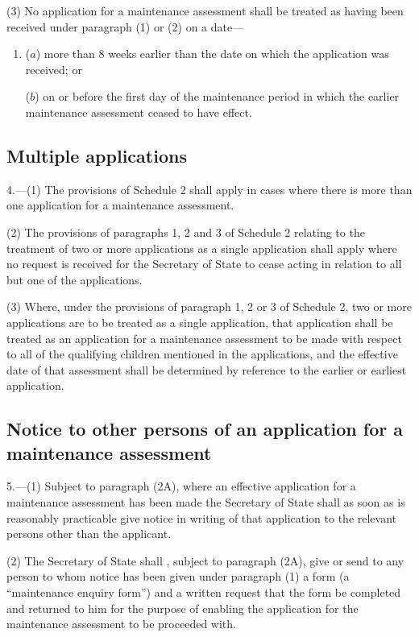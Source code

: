 \documentclass[a4paper]{article}
\begin{document}
(3) No application for a maintenance assessment shall be treated as having been received under paragraph (1) or (2) on a date—
\begin{enumerate}\item[]
($a$) more than 8 weeks earlier than the date on which the application was received; or

($b$) on or before the first day of the maintenance period in which the earlier maintenance assessment ceased to have effect.
\end{enumerate}

\subsection[4. Multiple applications]{Multiple applications}

4.—(1) The provisions of Schedule 2 shall apply in cases where there is more than one application for a maintenance assessment.

(2) The provisions of paragraphs 1, 2 and 3 of Schedule 2 relating to the treatment of two or more applications as a single application shall apply where no request is received for the Secretary of State to cease acting in relation to all but one of the applications.

(3) Where, under the provisions of paragraph 1, 2 or 3 of Schedule 2, two or more applications are to be treated as a single application, that application shall be treated as an application for a maintenance assessment to be made with respect to all of the qualifying children mentioned in the applications, and the effective date of that assessment shall be determined by reference to the earlier or earliest application.

\subsection[5. Notice to other persons of an application for a maintenance assessment]{Notice to other persons of an application for a maintenance assessment}

5.—(1) 
Subject to paragraph (2A), where %
an effective application for a maintenance assessment has been made the Secretary of State shall as soon as is reasonably practicable give notice in writing of that application to the relevant persons other than the applicant.

(2) The Secretary of State shall%
, subject to paragraph (2A), %
 give or send to any person to whom notice has been given under paragraph (1) a form (a “maintenance enquiry form”) and a written request that the form be completed and returned to him for the purpose of enabling the application for the maintenance assessment to be proceeded with.
\end{document}
